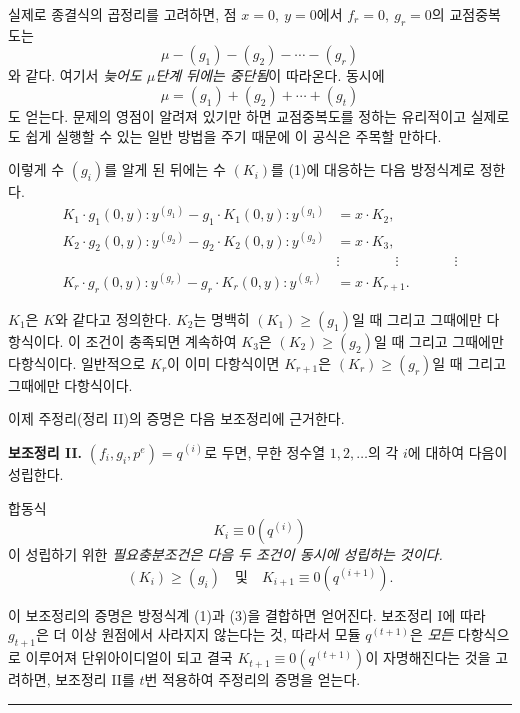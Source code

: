 실제로 종결식의 곱정리를 고려하면, 점 \(x=0,\ y=0\)에서 \(f_r=0,\ g_r=0\)의 교점중복도는
\[
\mu-(g_1)-(g_2)-\cdots-(g_r)
\]
와 같다. 여기서 \emph{늦어도 \(\mu\)단계 뒤에는 중단됨}이 따라온다. 동시에
\begin{equation}
\tag{2}
\mu=(g_1)+(g_2)+\cdots+(g_t)
\end{equation}
도 얻는다. 문제의 영점이 알려져 있기만 하면 교점중복도를 정하는 유리적이고 실제로도 쉽게 실행할 수 있는 일반 방법을 주기 때문에 이 공식은 주목할 만하다.

이렇게 수 \((g_i)\)를 알게 된 뒤에는 수 \((K_i)\)를 (1)에 대응하는 다음 방정식계로 정한다.
\begin{equation}
\tag{3}
\begin{aligned}
K_1\cdot g_1(0,y):y^{(g_1)} - g_1\cdot K_1(0,y):y^{(g_1)} &= x\cdot K_2,\\
K_2\cdot g_2(0,y):y^{(g_2)} - g_2\cdot K_2(0,y):y^{(g_2)} &= x\cdot K_3,\\
&\vdots \qquad\qquad\vdots\qquad\qquad\vdots\\
K_r\cdot g_r(0,y):y^{(g_r)} - g_r\cdot K_r(0,y):y^{(g_r)} &= x\cdot K_{r+1}.
\end{aligned}
\end{equation}

\(K_1\)은 \(K\)와 같다고 정의한다. \(K_2\)는 명백히 \((K_1)\geq(g_1)\)일 때 그리고 그때에만 다항식이다. 이 조건이 충족되면 계속하여 \(K_3\)은 \((K_2)\geq(g_2)\)일 때 그리고 그때에만 다항식이다. 일반적으로 \(K_r\)이 이미 다항식이면 \(K_{r+1}\)은 \((K_r)\geq(g_r)\)일 때 그리고 그때에만 다항식이다.

이제 주정리(정리 II)의 증명은 다음 보조정리에 근거한다.

\textbf{보조정리 II.} \((f_i,g_i,p^e)=q^{(i)}\)로 두면, 무한 정수열 \(1,2,\ldots\)의 각 \(i\)에 대하여 다음이 성립한다.

합동식
\[
K_i\equiv0(q^{(i)})
\]
이 성립하기 위한 \emph{필요충분조건은 다음 두 조건이 동시에 성립하는 것이다.}
\[
(K_i)\geq(g_i)\quad\text{및}\quad K_{i+1}\equiv0(q^{(i+1)}).
\]

이 보조정리의 증명은 방정식계 (1)과 (3)을 결합하면 얻어진다. 보조정리 I에 따라 \(g_{t+1}\)은 더 이상 원점에서 사라지지 않는다는 것, 따라서 모듈 \(q^{(t+1)}\)은 \emph{모든} 다항식으로 이루어져 단위아이디얼이 되고 결국 \(K_{t+1}\equiv0(q^{(t+1)})\)이 자명해진다는 것을 고려하면, 보조정리 II를 \(t\)번 적용하여 주정리의 증명을 얻는다.

\begin{center}
\rule{4cm}{0.4pt}
\end{center}

